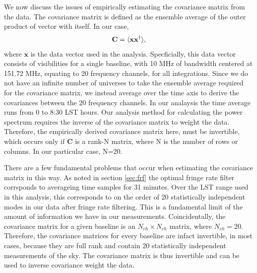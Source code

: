 \documentclass[twocolumn,numberedappendix]{emulateapj} \shorttitle{PSA64}
\newcommand{\x}{\mathbf{x}} \newcommand{\xhat}{\hat{\mathbf{x}}}
\newcommand{\C}{\mathbf{C}} \newcommand{\Q}{\mathbf{Q}}
\begin{document}
We now discuss the issues of empirically estimating the covariance matrix from
the data. The covariance matrix is defined as the ensemble average of the outer
product of vector with itself. In our case, 
\begin{equation}
    \C = \expval{\x\x^{\dagger}}, 
\end{equation}
where $\x$ is the data vector used in the analysis. Specficially, this data
vector consists of visibilities for a single baseline, with 10 MHz of bandwidth
centered at 151.72 MHz, equating to 20 frequency channels, for all integrations.
Since we do not have an infinite number of universes to take the ensemble
average required for the covariance matrix, we instead average  over the time
axis to derive the covariances between the 20 frequency channels. In our
analaysis the time average runs from 0 to 8:30 LST hours. Our analysis method
for calculating the power spectrum requires the inverse of the covariance
matrix to weight the data. Therefore, the empirically derived covariance matrix
here, must be invertible, which occurs only if $\C$ is a rank-N matrix, where N
is the number of rows or columns. In our particular case, N=20.

There are a few fundamental problems that occur when estimating the covariance
matrix in this way. As noted in section \ref{sec:frf} the optimal fringe rate
filter corrsponds to averageing time samples for 31 minutes. Over the LST range
used in this analysis, this corresponds to on the order of 20 statistically
independent modes in our data after fringe rate filtering. This is a fundamental
limit of the amount of information we have in our measurements. Coincidentally,
the covariance matrix for a given baseline is an $N_{ch} \times N_{ch}$ matrix,
where $N_{ch}=20$.  Therefore, the covariance matrices for every baseline are
infact invertible, in most cases,  because they are full rank and contain 20
statistically independent measurements of the sky. The covariance matrix is thus
invertible and can be used to inverse covariance weight the data.
\end{document}
